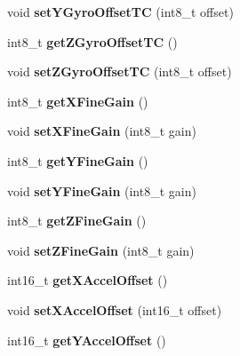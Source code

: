 \begin{DoxyCompactItemize}
void {\bfseries set\+Y\+Gyro\+Offset\+TC} (int8\+\_\+t offset)
\item 
\mbox{\label{class_m_p_u6050_afb9254a04feb7909cb808e94fa4fc44c}} 
int8\+\_\+t {\bfseries get\+Z\+Gyro\+Offset\+TC} ()
\item 
\mbox{\label{class_m_p_u6050_a1d9fc7f1058c4ab9a8a586e3fc30d12d}} 
void {\bfseries set\+Z\+Gyro\+Offset\+TC} (int8\+\_\+t offset)
\item 
\mbox{\label{class_m_p_u6050_a9c9332a5050be54fa47f321be01d524b}} 
int8\+\_\+t {\bfseries get\+X\+Fine\+Gain} ()
\item 
\mbox{\label{class_m_p_u6050_a73d4473d134cf5f7c516ff38faa2b4a8}} 
void {\bfseries set\+X\+Fine\+Gain} (int8\+\_\+t gain)
\item 
\mbox{\label{class_m_p_u6050_ad471fd5499dd2fbf730c066a8893420d}} 
int8\+\_\+t {\bfseries get\+Y\+Fine\+Gain} ()
\item 
\mbox{\label{class_m_p_u6050_a7f97e86dcfa1d491d8f809112c6fb40b}} 
void {\bfseries set\+Y\+Fine\+Gain} (int8\+\_\+t gain)
\item 
\mbox{\label{class_m_p_u6050_a13c980e62e6e7774299fea1c827b6e7a}} 
int8\+\_\+t {\bfseries get\+Z\+Fine\+Gain} ()
\item 
\mbox{\label{class_m_p_u6050_a98107dec68994cfc8c8cb1d0d78d2b6b}} 
void {\bfseries set\+Z\+Fine\+Gain} (int8\+\_\+t gain)
\item 
\mbox{\label{class_m_p_u6050_afdfe715ced419d117c2c47007d631f9e}} 
int16\+\_\+t {\bfseries get\+X\+Accel\+Offset} ()
\item 
\mbox{\label{class_m_p_u6050_a447144e025f55b1dc96d7c209c5defd6}} 
void {\bfseries set\+X\+Accel\+Offset} (int16\+\_\+t offset)
\item 
\mbox{\label{class_m_p_u6050_a7753d3c3f5d9e341f1ed0712079a0d12}} 
int16\+\_\+t {\bfseries get\+Y\+Accel\+Offset} ()
\item 

\end{DoxyCompactItemize}
